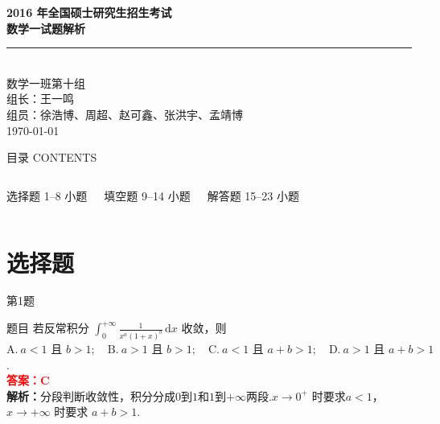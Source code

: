 \documentclass[aspectratio=169]{beamer}
\begin{document}
\begin{frame}[plain]
\vfill
\begin{center}
{\Huge\bfseries\color{mycolor} 2016 年全国硕士研究生招生考试}\\[0.5em]
{\Huge\bfseries\color{mycolor} 数学一试题解析}\\[2em]
\rule{0.8\textwidth}{2pt}\\[2em]
{\large 数学一班第十组}\\[0.6em]
{\normalsize 组长：王一鸣}\\[0.6em]
{\normalsize 组员：徐浩博、周超、赵可鑫、张洪宇、孟靖博}\\[1.2em]
{\normalsize\color{gray}\today}
\end{center}
\vfill
\end{frame}

\begin{frame}{目录 CONTENTS}
\begin{columns}[T]
\begin{block}{选择题}
1--8 小题
\end{block}
\begin{block}{填空题}
9--14 小题
\end{block}
\begin{block}{解答题}
15--23 小题
\end{block}
\end{columns}
\end{frame}

\section{选择题}

\begin{frame}{第1题}
\begin{block}{题目}
若反常积分 \(\displaystyle\int_{0}^{+\infty} \frac{1}{x^{a}(1+x)^{b}} \,\mathrm{d}x\) 收敛，则
$\mathrm{A.}\ a<1 \text{ 且 } b>1; \quad
\mathrm{B.}\ a>1 \text{ 且 } b>1; \quad
\mathrm{C.}\ a<1 \text{ 且 } a+b>1; \quad
\mathrm{D.}\ a>1 \text{ 且 } a+b>1$.
\\
\textcolor{red}{\textbf{答案：}$\mathbf{C}$} \\
\textbf{解析：}分段判断收敛性，积分分成$0$到$1$和$1$到$+\infty$两段.$x\to0^+$ 时要求$a<1$，$x\to+\infty$ 时要求 $a+b>1$.
\end{block}
\end{frame}
\end{document}
